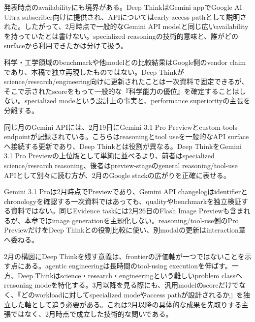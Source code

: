 \begin{claimboundary}
発表時点のavailabilityにも境界がある。Deep ThinkはGemini appでGoogle AI Ultra subscriber向けに提供され、APIについてはearly-access pathとして説明された。したがって、2月時点で一般的なGemini API modelと同じ広いavailabilityを持っていたとは書けない。specialized reasoningの技術的意味と、誰がどのsurfaceから利用できたかは分けて扱う。\autocite{src-dd5d9b8662f3}
\end{claimboundary}

\begin{claimboundary}
科学・工学領域のbenchmarkや他modelとの比較結果はGoogle側のvendor claimであり、本稿で独立再現したものではない。Deep Thinkがscience/research/engineering向けに更新されたことは一次資料で固定できるが、そこで示されたscoreをもって一般的な『科学能力の優位』を確定することはしない。specialized modeという設計上の事実と、performance superiorityの主張を分離する。\autocite{src-dd5d9b8662f3}
\end{claimboundary}

同じ月のGemini APIには、2月19日にGemini 3.1 Pro Previewとcustom-tools endpointが記録されている。こちらはreasoningとtool useを一般的なAPI surfaceへ接続する更新であり、Deep Thinkとは役割が異なる。Deep ThinkをGemini 3.1 Pro Previewの上位版として単純に並べるより、前者はspecialized science/research reasoning、後者はpreview-stageのgeneral reasoning/tool-use APIとして別々に読む方が、2月のGoogle stackの広がりを正確に表せる。\autocite{src-a24fd97eb3d0}


\begin{claimboundary}
Gemini 3.1 Proは2月時点でPreviewであり、Gemini API changelogはidentifierとchronologyを確認する一次資料ではあっても、qualityやbenchmarkを独立検証する資料ではない。同じEvidence taskには2月26日のFlash Image Previewも含まれるが、本章ではimage generationを主題化しない。reasoning/tool-use側のPro PreviewだけをDeep Thinkとの役割比較に使い、別modalの更新はinteraction章へ委ねる。\autocite{src-a24fd97eb3d0}
\end{claimboundary}

2月の構図にDeep Thinkを残す意義は、frontierの評価軸が一つではないことを示す点にある。agentic engineeringは長時間のtool-using executionを伸ばす。一方、Deep Thinkはscience・research・engineeringという難しいproblem classへreasoning modeを特化する。3月以降を見る際にも、汎用modelのscoreだけでなく、『どのworkloadに対してspecialized modeやaccess pathが設計されるか』を独立した軸として追う必要がある。これは2月以降の具体的な成果を先取りする主張ではなく、2月時点で成立した技術的な問いである。\autocite{src-a24fd97eb3d0,src-dd5d9b8662f3}
